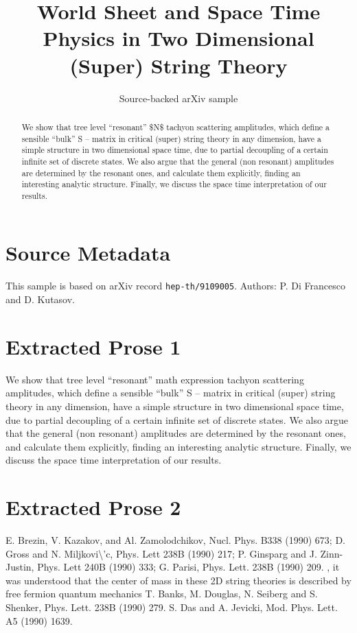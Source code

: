 \documentclass[11pt]{article}
\title{World Sheet and Space Time Physics in Two Dimensional (Super) String
  Theory}
\author{Source-backed arXiv sample}
\date{}
\begin{document}
\maketitle
\begin{abstract}
We show that tree level ``resonant'' \$N\$ tachyon scattering amplitudes, which define a sensible ``bulk'' S -- matrix in critical (super) string theory in any dimension, have a simple structure in two dimensional space time, due to partial decoupling of a certain infinite set of discrete states. We also argue that the general (non resonant) amplitudes are determined by the resonant ones, and calculate them explicitly, finding an interesting analytic structure. Finally, we discuss the space time interpretation of our results.
\end{abstract}
\section{Source Metadata}
This sample is based on arXiv record \texttt{hep-th/9109005}. Authors: P. Di Francesco and D. Kutasov.
\section{Extracted Prose 1}
We show that tree level ``resonant'' math expression tachyon scattering amplitudes, which define a sensible ``bulk'' S -- matrix in critical (super) string theory in any dimension, have a simple structure in two dimensional space time, due to partial decoupling of a certain infinite set of discrete states. We also argue that the general (non resonant) amplitudes are determined by the resonant ones, and calculate them explicitly, finding an interesting analytic structure. Finally, we discuss the space time interpretation of our results.
\section{Extracted Prose 2}
E. Brezin, V. Kazakov, and Al. Zamolodchikov, Nucl. Phys. B338 (1990) 673; D. Gross and N. Miljkovi\textbackslash{}'c, Phys. Lett 238B (1990) 217; P. Ginsparg and J. Zinn-Justin, Phys. Lett 240B (1990) 333; G. Parisi, Phys. Lett. 238B (1990) 209. , it was understood that the center of mass in these 2D string theories is described by free fermion quantum mechanics T. Banks, M. Douglas, N. Seiberg and S. Shenker, Phys. Lett. 238B (1990) 279. S. Das and A. Jevicki, Mod. Phys. Lett. A5 (1990) 1639.
\end{document}
